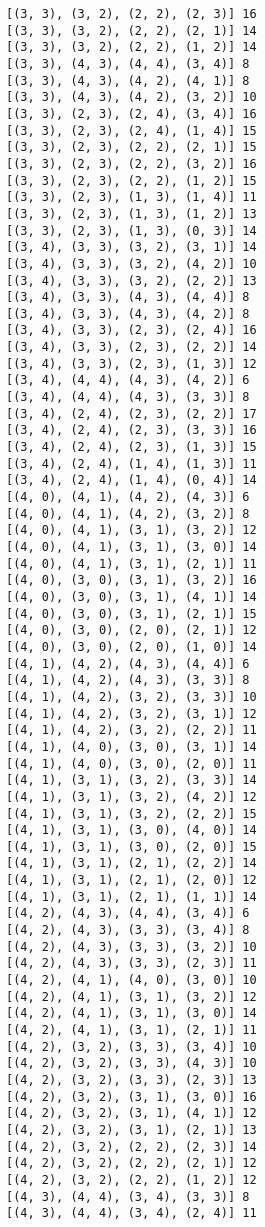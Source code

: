 \documentclass[11pt]{article}
\begin{document}
\begin{Verbatim}[commandchars=\\\{\}]
[(3, 3), (3, 2), (2, 2), (2, 3)] 16
[(3, 3), (3, 2), (2, 2), (2, 1)] 14
[(3, 3), (3, 2), (2, 2), (1, 2)] 14
[(3, 3), (4, 3), (4, 4), (3, 4)] 8
[(3, 3), (4, 3), (4, 2), (4, 1)] 8
[(3, 3), (4, 3), (4, 2), (3, 2)] 10
[(3, 3), (2, 3), (2, 4), (3, 4)] 16
[(3, 3), (2, 3), (2, 4), (1, 4)] 15
[(3, 3), (2, 3), (2, 2), (2, 1)] 15
[(3, 3), (2, 3), (2, 2), (3, 2)] 16
[(3, 3), (2, 3), (2, 2), (1, 2)] 15
[(3, 3), (2, 3), (1, 3), (1, 4)] 11
[(3, 3), (2, 3), (1, 3), (1, 2)] 13
[(3, 3), (2, 3), (1, 3), (0, 3)] 14
[(3, 4), (3, 3), (3, 2), (3, 1)] 14
[(3, 4), (3, 3), (3, 2), (4, 2)] 10
[(3, 4), (3, 3), (3, 2), (2, 2)] 13
[(3, 4), (3, 3), (4, 3), (4, 4)] 8
[(3, 4), (3, 3), (4, 3), (4, 2)] 8
[(3, 4), (3, 3), (2, 3), (2, 4)] 16
[(3, 4), (3, 3), (2, 3), (2, 2)] 14
[(3, 4), (3, 3), (2, 3), (1, 3)] 12
[(3, 4), (4, 4), (4, 3), (4, 2)] 6
[(3, 4), (4, 4), (4, 3), (3, 3)] 8
[(3, 4), (2, 4), (2, 3), (2, 2)] 17
[(3, 4), (2, 4), (2, 3), (3, 3)] 16
[(3, 4), (2, 4), (2, 3), (1, 3)] 15
[(3, 4), (2, 4), (1, 4), (1, 3)] 11
[(3, 4), (2, 4), (1, 4), (0, 4)] 14
[(4, 0), (4, 1), (4, 2), (4, 3)] 6
[(4, 0), (4, 1), (4, 2), (3, 2)] 8
[(4, 0), (4, 1), (3, 1), (3, 2)] 12
[(4, 0), (4, 1), (3, 1), (3, 0)] 14
[(4, 0), (4, 1), (3, 1), (2, 1)] 11
[(4, 0), (3, 0), (3, 1), (3, 2)] 16
[(4, 0), (3, 0), (3, 1), (4, 1)] 14
[(4, 0), (3, 0), (3, 1), (2, 1)] 15
[(4, 0), (3, 0), (2, 0), (2, 1)] 12
[(4, 0), (3, 0), (2, 0), (1, 0)] 14
[(4, 1), (4, 2), (4, 3), (4, 4)] 6
[(4, 1), (4, 2), (4, 3), (3, 3)] 8
[(4, 1), (4, 2), (3, 2), (3, 3)] 10
[(4, 1), (4, 2), (3, 2), (3, 1)] 12
[(4, 1), (4, 2), (3, 2), (2, 2)] 11
[(4, 1), (4, 0), (3, 0), (3, 1)] 14
[(4, 1), (4, 0), (3, 0), (2, 0)] 11
[(4, 1), (3, 1), (3, 2), (3, 3)] 14
[(4, 1), (3, 1), (3, 2), (4, 2)] 12
[(4, 1), (3, 1), (3, 2), (2, 2)] 15
[(4, 1), (3, 1), (3, 0), (4, 0)] 14
[(4, 1), (3, 1), (3, 0), (2, 0)] 15
[(4, 1), (3, 1), (2, 1), (2, 2)] 14
[(4, 1), (3, 1), (2, 1), (2, 0)] 12
[(4, 1), (3, 1), (2, 1), (1, 1)] 14
[(4, 2), (4, 3), (4, 4), (3, 4)] 6
[(4, 2), (4, 3), (3, 3), (3, 4)] 8
[(4, 2), (4, 3), (3, 3), (3, 2)] 10
[(4, 2), (4, 3), (3, 3), (2, 3)] 11
[(4, 2), (4, 1), (4, 0), (3, 0)] 10
[(4, 2), (4, 1), (3, 1), (3, 2)] 12
[(4, 2), (4, 1), (3, 1), (3, 0)] 14
[(4, 2), (4, 1), (3, 1), (2, 1)] 11
[(4, 2), (3, 2), (3, 3), (3, 4)] 10
[(4, 2), (3, 2), (3, 3), (4, 3)] 10
[(4, 2), (3, 2), (3, 3), (2, 3)] 13
[(4, 2), (3, 2), (3, 1), (3, 0)] 16
[(4, 2), (3, 2), (3, 1), (4, 1)] 12
[(4, 2), (3, 2), (3, 1), (2, 1)] 13
[(4, 2), (3, 2), (2, 2), (2, 3)] 14
[(4, 2), (3, 2), (2, 2), (2, 1)] 12
[(4, 2), (3, 2), (2, 2), (1, 2)] 12
[(4, 3), (4, 4), (3, 4), (3, 3)] 8
[(4, 3), (4, 4), (3, 4), (2, 4)] 11

\end{Verbatim}
\end{document}
